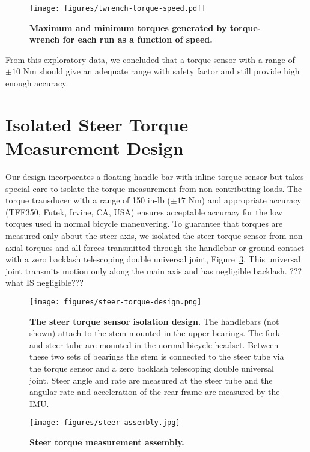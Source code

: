 \documentclass[10pt]{article}
\begin{document}
\begin{figure}
  \centering
  \texttt{[image: figures/twrench-torque-speed.pdf]}
  \caption{{\bf Maximum  and minimum torques generated by torque-wrench for
    each run as a function of speed.}
    }
  \label{fig:twrench-torque-speed}
\end{figure}

From this exploratory data, we concluded that a torque sensor with a range of
$\pm10$ Nm should give an adequate range with safety factor and still provide
high enough accuracy.

\section*{Isolated Steer Torque Measurement Design}

Our design incorporates a floating handle bar with inline torque sensor but
takes special care to isolate the torque measurement from non-contributing
loads. The torque transducer with a range of 150 in-lb ($\pm 17$ Nm) and
appropriate accuracy (TFF350, Futek, Irvine, CA, USA) ensures acceptable
accuracy for the low torques used in normal bicycle maneuvering. To guarantee
that torques are measured only about the steer axis, we isolated the steer
torque sensor from non-axial torques and all forces transmitted through the
handlebar or ground contact with a zero backlash telescoping double universal
joint, Figure~\ref{fig:steer-torque-design}. This universal joint  transmits
motion only along the main axis and has negligible backlash. ??? what IS
negligible???

\begin{figure}
  \centering
  \texttt{[image: figures/steer-torque-design.png]}
  \caption{{\bf The steer torque sensor isolation design.} The handlebars (not
    shown) attach to the stem mounted in the upper bearings. The fork and steer
    tube are mounted in the normal bicycle headset. Between these two sets of
    bearings the stem is connected to the steer tube via the torque sensor and
    a zero backlash telescoping double universal joint. Steer angle and rate
    are measured at the steer tube and the angular rate and acceleration of the
    rear frame are measured by the IMU.}
  \label{fig:steer-torque-design}
\end{figure}

\begin{figure}
  \centering
  \texttt{[image: figures/steer-assembly.jpg]}
  \caption{{\bf Steer torque measurement assembly.} }
  \label{fig:steer-torque-design}
\end{figure}
\end{document}
